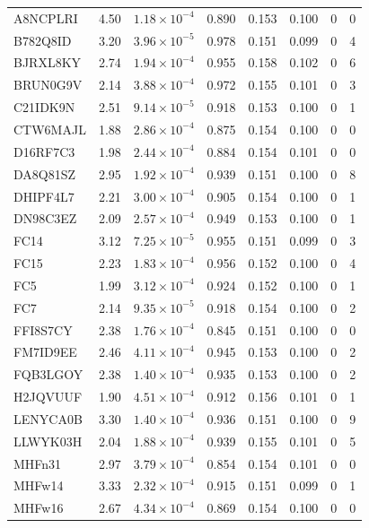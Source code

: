 \begin{landscape}
\begin{longtable}{lrcccccc}
A8NCPLRI  & 4.50 & $1.18\times10^{-4}$ & 0.890 & 0.153 & 0.100 & 0 & 0 \\
B782Q8ID  & 3.20 & $3.96\times10^{-5}$ & 0.978 & 0.151 & 0.099 & 0 & 4 \\
BJRXL8KY  & 2.74 & $1.94\times10^{-4}$ & 0.955 & 0.158 & 0.102 & 0 & 6 \\
BRUN0G9V  & 2.14 & $3.88\times10^{-4}$ & 0.972 & 0.155 & 0.101 & 0 & 3 \\
C21IDK9N  & 2.51 & $9.14\times10^{-5}$ & 0.918 & 0.153 & 0.100 & 0 & 1 \\
CTW6MAJL  & 1.88 & $2.86\times10^{-4}$ & 0.875 & 0.154 & 0.100 & 0 & 0 \\
D16RF7C3  & 1.98 & $2.44\times10^{-4}$ & 0.884 & 0.154 & 0.101 & 0 & 0 \\
DA8Q81SZ  & 2.95 & $1.92\times10^{-4}$ & 0.939 & 0.151 & 0.100 & 0 & 8 \\
DHIPF4L7  & 2.21 & $3.00\times10^{-4}$ & 0.905 & 0.154 & 0.100 & 0 & 1 \\
DN98C3EZ  & 2.09 & $2.57\times10^{-4}$ & 0.949 & 0.153 & 0.100 & 0 & 1 \\
FC14      & 3.12 & $7.25\times10^{-5}$ & 0.955 & 0.151 & 0.099 & 0 & 3 \\
FC15      & 2.23 & $1.83\times10^{-4}$ & 0.956 & 0.152 & 0.100 & 0 & 4 \\
FC5       & 1.99 & $3.12\times10^{-4}$ & 0.924 & 0.152 & 0.100 & 0 & 1 \\
FC7       & 2.14 & $9.35\times10^{-5}$ & 0.918 & 0.154 & 0.100 & 0 & 2 \\
FFI8S7CY  & 2.38 & $1.76\times10^{-4}$ & 0.845 & 0.151 & 0.100 & 0 & 0 \\
FM7ID9EE  & 2.46 & $4.11\times10^{-4}$ & 0.945 & 0.153 & 0.100 & 0 & 2 \\
FQB3LGOY  & 2.38 & $1.40\times10^{-4}$ & 0.935 & 0.153 & 0.100 & 0 & 2 \\
H2JQVUUF  & 1.90 & $4.51\times10^{-4}$ & 0.912 & 0.156 & 0.101 & 0 & 1 \\
LENYCA0B  & 3.30 & $1.40\times10^{-4}$ & 0.936 & 0.151 & 0.100 & 0 & 9 \\
LLWYK03H  & 2.04 & $1.88\times10^{-4}$ & 0.939 & 0.155 & 0.101 & 0 & 5 \\
MHFn31    & 2.97 & $3.79\times10^{-4}$ & 0.854 & 0.154 & 0.101 & 0 & 0 \\
MHFw14    & 3.33 & $2.32\times10^{-4}$ & 0.915 & 0.151 & 0.099 & 0 & 1 \\
MHFw16    & 2.67 & $4.34\times10^{-4}$ & 0.869 & 0.154 & 0.100 & 0 & 0 \\

\end{longtable}
\end{landscape}
